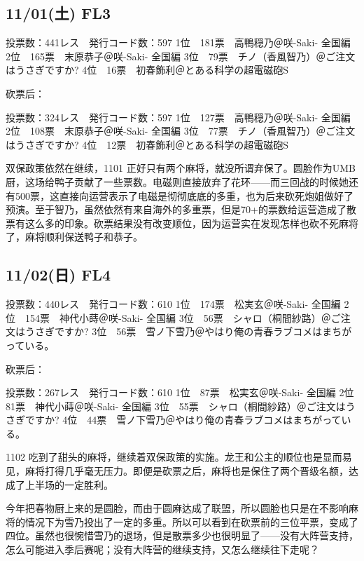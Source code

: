 \subsection{11/01(土) FL3}

    投票数：441レス　発行コード数：597
    1位　181票　高鴨穏乃＠咲-Saki- 全国編
    2位　165票　末原恭子＠咲-Saki- 全国編
    3位　79票　チノ（香風智乃）＠ご注文はうさぎですか?
    4位　16票　初春飾利＠とある科学の超電磁砲S

砍票后：

    投票数：324レス　発行コード数：597
    1位　127票　高鴨穏乃＠咲-Saki- 全国編
    2位　108票　末原恭子＠咲-Saki- 全国編
    3位　77票　チノ（香風智乃）＠ご注文はうさぎですか?
    4位　12票　初春飾利＠とある科学の超電磁砲S

双保政策依然在继续，1101 正好只有两个麻将，就没所谓弃保了。圆脸作为UMB厨，这场给鸭子贡献了一些票数。电磁则直接放弃了花环——而三回战的时候她还有500票，这直接向运营表示了电磁是彻彻底底的多重，也为后来砍死炮姐做好了预演。至于智乃，虽然依然有来自海外的多重票，但是70+的票数给运营造成了散票有这么多的印象。砍票结果没有改变顺位，因为运营实在发现怎样也砍不死麻将了，麻将顺利保送鸭子和恭子。

\subsection{11/02(日) FL4}

    投票数：440レス　発行コード数：610
    1位　174票　松実玄＠咲-Saki- 全国編
    2位　154票　神代小蒔＠咲-Saki- 全国編
    3位　56票　シャロ（桐間紗路）＠ご注文はうさぎですか?
    3位　56票　雪ノ下雪乃＠やはり俺の青春ラブコメはまちがっている。

砍票后：

    投票数：267レス　発行コード数：610
    1位　87票　松実玄＠咲-Saki- 全国編
    2位　81票　神代小蒔＠咲-Saki- 全国編
    3位　55票　シャロ（桐間紗路）＠ご注文はうさぎですか?
    4位　44票　雪ノ下雪乃＠やはり俺の青春ラブコメはまちがっている。

1102 吃到了甜头的麻将，继续着双保政策的实施。龙王和公主的顺位也是显而易见，麻将打得几乎毫无压力。即便是砍票之后，麻将也是保住了两个晋级名额，达成了上半场的一定胜利。

今年把春物厨上来的是圆脸，而由于圆麻达成了联盟，所以圆脸也只是在不影响麻将的情况下为雪乃投出了一定的多重。所以可以看到在砍票前的三位平票，变成了四位。虽然也很惋惜雪乃的退场，但是散票多少也很明显了——没有大阵营支持，怎么可能进入季后赛呢；没有大阵营的继续支持，又怎么继续往下走呢？

